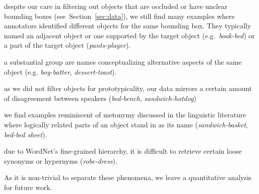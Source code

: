 \begin{description}[style=unboxed,leftmargin=0.2cm]
\setlength{\itemsep}{0pt}
\setlength{\parskip}{0pt}
\item[Referential uncertainty:] despite our care in filtering out objects that are occluded or have unclear bounding boxes (see\ Section~\ref{sec:data}), we still find many examples where annotators identified different objects for the same bounding box. They typically named an adjacent object or one supported by the target object (e.g.\ \textit{book-bed}) or a part of the target object (\textit{pants-player}).
\item[Cross-classification:] a substantial group are names conceptualizing alternative aspects of the same object (e.g. \textit{boy-batter}, \textit{dessert-toast}).
\item[Conceptual disagreement:] as we did not filter objects for prototypicality, our data mirrors a certain amount of disagreement between speakers (\textit{bed-bench}, \textit{sandwich-hotdog})
\item[Metonymy:] we find examples reminiscent of metonymy discussed in the linguistic literature \cite{pustejovsky1991generative} where logically related parts of an object stand in as its name (\textit{sandwich-basket}, \textit{bed-bed sheet}). 
\item[Issues with WordNet:] due to WordNet's fine-grained hierarchy, it is difficult to retrieve certain loose  synonyms or hypernyms (\textit{robe-dress}).
\end{description}
\vspace{-0.2cm}

As it is non-trivial to separate these phenomena, we leave a quantitative analysis for future work.

